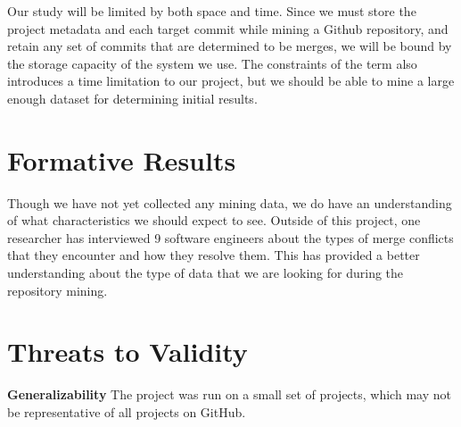 \documentclass{sig-alternate-05-2015}
\begin{document}
Our study will be limited by both space and time. Since we must store the project metadata and each target commit while mining a Github repository, and retain any set of commits that are determined to be merges, we will be bound by the storage capacity of the system we use. The constraints of the term also introduces a time limitation to our project, but we should be able to mine a large enough dataset for determining initial results.

\section{Formative Results}\label{Results}
Though we have not yet collected any mining data, we do have an understanding of what characteristics we should expect to see. Outside of this project, one researcher has interviewed 9 software engineers about the types of merge conflicts that they encounter and how they resolve them. This has provided a better understanding about the type of data that we are looking for during the repository mining.

\section{Threats to Validity}
\textbf{Generalizability}
The project was run on a small set of projects, which may not be representative of all projects on GitHub.


{}

\end{document}
